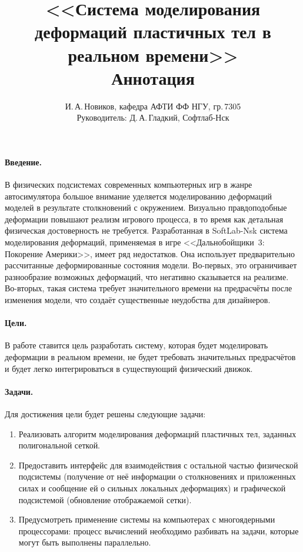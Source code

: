 \documentclass[a4paper,11pt,twocolumn]{article}
\author{И.\,А.\,Новиков, кафедра АФТИ ФФ НГУ, гр.\,7305\\ Руководитель: Д.\,А.\,Гладкий, Софтлаб-Нск}
\title{<<Система моделирования деформаций пластичных тел в реальном времени>>\\ Аннотация}
\begin{document}
  \maketitle
  \thispagestyle{empty}
  \paragraph{Введение.}
    В физических подсистемах современных компьютерных игр в жанре автосимулятора большое внимание
    уделяется моделированию деформаций моделей в результате столкновений с окружением. Визуально
    правдоподобные деформации повышают реализм игрового процесса, в то время как детальная
    физическая достоверность не требуется. Разработанная в SoftLab-Nsk система моделирования
    деформаций, применяемая в игре <<Дальнобойщики~3: Покорение Америки>>, имеет ряд недостатков.
    Она использует предварительно рассчитанные деформированные состояния модели. Во-первых, это
    ограничивает разнообразие возможных деформаций, что негативно сказывается на реализме.
    Во-вторых, такая система требует значительного времени на предрасчёты после изменения модели,
    что создаёт существенные неудобства для дизайнеров.
  \paragraph{Цели.}
    В работе ставится цель разработать систему, которая будет моделировать деформации в реальном
    времени, не будет требовать значительных предрасчётов и будет легко интегрироваться в
    существующий физический движок.
  \newpage
  \paragraph{Задачи.}
    Для достижения цели будет решены следующие задачи:
    \begin{enumerate}
      \item Реализовать алгоритм моделирования деформаций пластичных тел, заданных полигональной сеткой.
      \item Предоставить интерфейс для взаимодействия с остальной частью физической подсистемы
        (получение от неё информации о столкновениях и приложенных силах и сообщение ей о
        сильных локальных деформациях) и графической подсистемой (обновление отображаемой сетки).
      \item Предусмотреть применение системы на компьютерах с многоядерными процессорами: процесс
        вычислений необходимо разбивать на задачи, которые могут быть выполнены параллельно.
    \end{enumerate}
\end{document}
